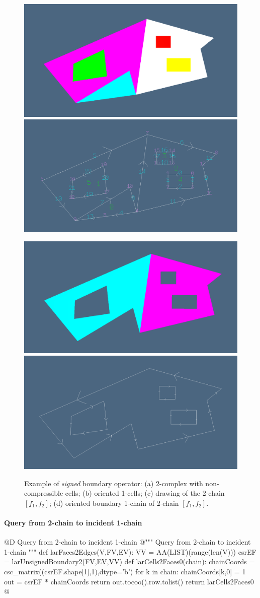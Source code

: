 \documentclass[11pt,oneside]{article}    %
\begin{document}
\begin{figure}[htbp] %
   \includegraphics[height=0.27\linewidth,width=0.495\linewidth]{images/larSignedBoundary2a} 
   \includegraphics[height=0.27\linewidth,width=0.495\linewidth]{images/larSignedBoundary2b} 
   
   \includegraphics[height=0.27\linewidth,width=0.495\linewidth]{images/larSignedBoundary2c} 
   \includegraphics[height=0.27\linewidth,width=0.495\linewidth]{images/larSignedBoundary2d} 
   \caption{Example  of \emph{signed} boundary operator: (a) 2-complex with non-compressible cells; (b) oriented 1-cells; (c) drawing of the 2-chain $[f_1,f_2]$; (d) oriented boundary 1-chain of 2-chain $[f_1,f_2]$.}
   \label{fig:signedBoundary2}
\end{figure}


\paragraph{Query from 2-chain to incident 1-chain}
@D Query from 2-chain to incident 1-chain
@{""" Query from 2-chain to incident 1-chain """
def larFaces2Edges(V,FV,EV):
    VV = AA(LIST)(range(len(V)))
    csrEF = larUnsignedBoundary2(FV,EV,VV)
    def larCells2Faces0(chain):
        chainCoords = csc_matrix((csrEF.shape[1],1),dtype='b')
        for k in chain: chainCoords[k,0] = 1
        out = csrEF * chainCoords
        return out.tocoo().row.tolist()
    return larCells2Faces0
@}
\end{document}
